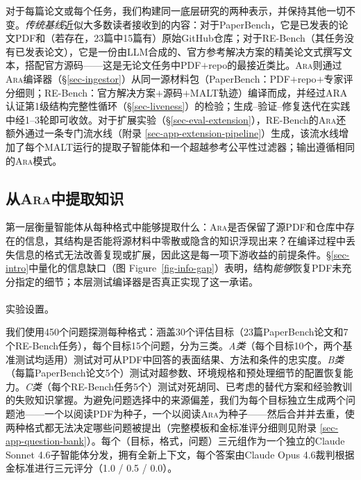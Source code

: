 \documentclass[
]{article}
\makeatletter
\let\oldparagraph\paragraph
\renewcommand{\paragraph}{
    \@ifstar
      \xxxParagraphStar
      \xxxParagraphNoStar
  }
\newcommand{\xxxParagraphStar}[1]{\oldparagraph*{#1}\mbox{}}
\newcommand{\xxxParagraphNoStar}[1]{\oldparagraph{#1}\mbox{}}
\theoremstyle{definition}
\newcommand{\ara}{\textsc{Ara}}
\makeatother
\begin{document}
对于每篇论文或每个任务，我们构建同一底层研究的两种表示，并保持其他一切不变。\emph{传统基线}近似大多数读者接收到的内容：对于PaperBench，它是已发表的论文PDF和（若存在，23篇中15篇有）原始GitHub仓库；对于RE-Bench（其任务没有已发表论文），它是一份由LLM合成的、官方参考解决方案的精美论文式撰写文本，搭配官方源码------这是无论文任务中PDF\(+\)repo的最接近类比。\ara{}则通过\ara{}编译器（\S\ref{sec-ingestor}）从同一源材料包（PaperBench：PDF\(+\)repo\(+\)专家评分细则；RE-Bench：官方解决方案\(+\)源码\(+\)MALT轨迹）编译而成，并经过ARA认证第1级结构完整性循环（\S\ref{sec-liveness}）的检验；生成--验证--修复迭代在实践中经1--3轮即可收敛。对于扩展实验（\S\ref{sec-eval-extension}），RE-Bench的\ara{}还额外通过一条专门流水线（附录
\ref{sec-app-extension-pipeline}）生成，该流水线增加了每个MALT运行的提取子智能体和一个超越参考公平性过滤器；输出遵循相同的\ara{}模式。

\subsection{\texorpdfstring{从\ara{}中提取知识}{从中提取知识}}\label{sec-eval-understanding}

第一层衡量智能体从每种格式中能够提取什么：\ara{}是否保留了源PDF和仓库中存在的信息，其结构是否能将源材料中零散或隐含的知识浮现出来？在编译过程中丢失信息的格式无法改善复现或扩展，因此这是每一项下游收益的前提条件。\S\ref{sec-intro}中量化的信息缺口（图
Figure~\ref{fig-info-gap}）表明，结构\emph{能够}恢复PDF未充分指定的细节；本层测试编译器是否真正实现了这一承诺。

\paragraph{实验设置。}\label{ux5b9eux9a8cux8bbeux7f6e}

我们使用450个问题探测每种格式：涵盖30个评估目标（23篇PaperBench论文和7个RE-Bench任务），每个目标15个问题，分为三类。\emph{A类}（每个目标10个，两个基准测试均适用）测试对可从PDF中回答的表面结果、方法和条件的忠实度。\emph{B类}（每篇PaperBench论文5个）测试对超参数、环境规格和预处理细节的配置恢复能力。\emph{C类}（每个RE-Bench任务5个）测试对死胡同、已考虑的替代方案和经验教训的失败知识掌握。为避免问题选择中的来源偏差，我们为每个目标独立生成两个问题池------一个以阅读PDF为种子，一个以阅读\ara{}为种子------然后合并并去重，使两种格式都无法决定哪些问题被提出（完整模板和金标准评分细则见附录
\ref{sec-app-question-bank}）。每个（目标，格式，问题）三元组作为一个独立的Claude
Sonnet 4.6子智能体分发，拥有全新上下文，每个答案由Claude Opus
4.6裁判根据金标准进行三元评分（1.0 / 0.5 / 0.0）。
\end{document}
